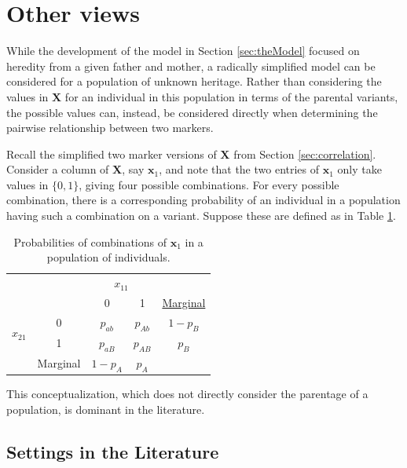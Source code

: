 \documentclass{article}
\newcommand{\ve}[1]{\mathbf{#1}}           %
\newcommand{\m}[1]{\mathbf{#1}}               %
\begin{document}
\section{Other views} \label{sec:apply}

While the development of the model in Section \ref{sec:theModel} focused on heredity from a given father and mother, a radically simplified model can be considered for a population of unknown heritage. Rather than considering the values in $\m{X}$ for an individual in this population in terms of the parental variants, the possible values can, instead, be considered directly when determining the pairwise relationship between two markers.

Recall the simplified two marker versions of $\m{X}$ from Section \ref{sec:correlation}. Consider a column of $\m{X}$, say $\ve{x}_1$, and note that the two entries of $\ve{x}_1$ only take values in $\{0,1\}$, giving four possible combinations. For every possible combination, there is a corresponding probability of an individual in a population having such a combination on a variant. Suppose these are defined as in Table \ref{tab:r2}.

\begin{table}[!ht]
  \centering
  \begin{tabular}{c c| c c| c}
    & \multicolumn{1}{c}{} & \multicolumn{2}{c}{$x_{11}$} & \\ \cline{3-4}
    & & 0 & 1 & \underline{Marginal} \\ \cline{2-4}
    \multirow{2}{*}{$x_{21}$} & \multicolumn{1}{|c|}{0} & $p_{ab}$ & $p_{Ab}$ & $1-p_B$ \\
    & \multicolumn{1}{|c|}{1} & $p_{aB}$ & $p_{AB}$ & $p_B$ \\ \cline{2-4}
    & \multicolumn{1}{c}{Marginal} & \multicolumn{1}{c}{$1 - p_A$} & \multicolumn{1}{c}{$p_A$} &  \\ 
  \end{tabular}
  \caption{Probabilities of combinations of $\ve{x}_1$ in a population of individuals.}
  \label{tab:r2}
\end{table}

This conceptualization, which does not directly consider the parentage of a population, is dominant in the literature.

\subsection{Settings in the Literature} \label{subsec:inlit}
\end{document}
